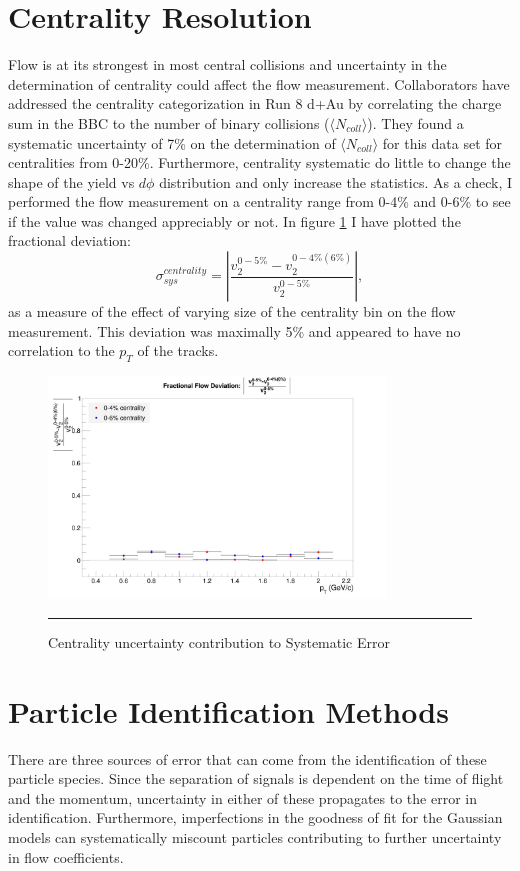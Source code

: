 \section{Centrality Resolution}
\label{sectcenterr}
Flow is at its strongest in most central collisions and uncertainty in the determination of centrality could affect the flow measurement. Collaborators have addressed the centrality categorization in Run 8 d+Au\citep{phenixcentrality} by correlating the charge sum in the BBC to the number of binary collisions ($\langle N_{coll} \rangle$). They found a systematic uncertainty of 7\% on the determination of $\langle N_{coll} \rangle$ for this data set for centralities from 0-20\%. Furthermore, centrality systematic do little to change the shape of the yield vs $d\phi$ distribution and only increase the statistics. As a check, I performed the flow measurement on a centrality range from 0-4\% and 0-6\% to see if the value was changed appreciably or not. In figure \ref{fig:centsys} I have plotted the fractional deviation:
\begin{equation}
\sigma_{sys}^{centrality} = \left| \frac{v_{2}^{0-5\%}-v_{2}^{0-4\%(6\%)}}{v_{2}^{0-5\%}} \right|,
\end{equation}
as a measure of the effect of varying size of the centrality bin on the flow measurement. This deviation was maximally 5\% and appeared to have no correlation to the $p_T$ of the tracks.

\begin{figure}[htbp]
  \centering
    \includegraphics[width=0.8\textwidth]{evtQA/CentSysErrs.jpg}
    \rule{35em}{0.5pt}
  \caption[Centrality uncertainty contribution to Systematic Error]{Centrality uncertainty contribution to Systematic Error}
  \label{fig:centsys}
\end{figure}

\section{Particle Identification Methods}
\label{sectpiderr}
There are three sources of error that can come from the identification of these particle species. Since the separation of signals is dependent on the time of flight and the momentum, uncertainty in either of these propagates to the error in identification. Furthermore, imperfections in the goodness of fit for the Gaussian models can systematically miscount particles contributing to further uncertainty in flow coefficients.

